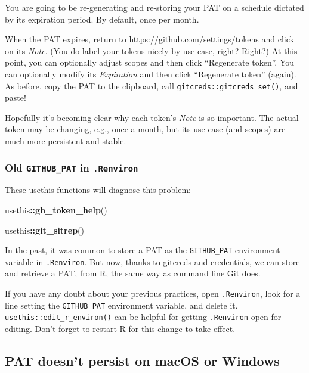\documentclass[
]{book}
\newenvironment{Shaded}{\begin{snugshade}}{\end{snugshade}}
\newcommand{\FunctionTok}[1]{\textcolor[rgb]{0.13,0.29,0.53}{\textbf{#1}}}
\newcommand{\NormalTok}[1]{#1}
\newcommand{\SpecialCharTok}[1]{\textcolor[rgb]{0.81,0.36,0.00}{\textbf{#1}}}
\begin{document}
You are going to be re-generating and re-storing your PAT on a schedule dictated by its expiration period.
By default, once per month.

When the PAT expires, return to \url{https://github.com/settings/tokens} and click on its \emph{Note}.
(You do label your tokens nicely by use case, right? Right?)
At this point, you can optionally adjust scopes and then click ``Regenerate token''.
You can optionally modify its \emph{Expiration} and then click ``Regenerate token'' (again).
As before, copy the PAT to the clipboard, call \texttt{gitcreds::gitcreds\_set()}, and paste!

Hopefully it's becoming clear why each token's \emph{Note} is so important.
The actual token may be changing, e.g., once a month, but its use case (and scopes) are much more persistent and stable.

\subsubsection{\texorpdfstring{Old \texttt{GITHUB\_PAT} in \texttt{.Renviron}}{Old GITHUB\_PAT in .Renviron}}\label{old-github_pat-in-.renviron}

These usethis functions will diagnose this problem:

\begin{Shaded}
\begin{Highlighting}[]
\NormalTok{usethis}\SpecialCharTok{::}\FunctionTok{gh\_token\_help}\NormalTok{()}

\NormalTok{usethis}\SpecialCharTok{::}\FunctionTok{git\_sitrep}\NormalTok{()}
\end{Highlighting}
\end{Shaded}

In the past, it was common to store a PAT as the \texttt{GITHUB\_PAT} environment variable in \texttt{.Renviron}.
But now, thanks to gitcreds and credentials, we can store and retrieve a PAT, from R, the same way as command line Git does.

If you have any doubt about your previous practices, open \texttt{.Renviron}, look for a line setting the \texttt{GITHUB\_PAT} environment variable, and delete it. \texttt{usethis::edit\_r\_environ()} can be helpful for getting \texttt{.Renviron} open for editing.
Don't forget to restart R for this change to take effect.

\subsection{PAT doesn't persist on macOS or Windows}\label{pat-doesnt-persist-on-macos-or-windows}
\end{document}
